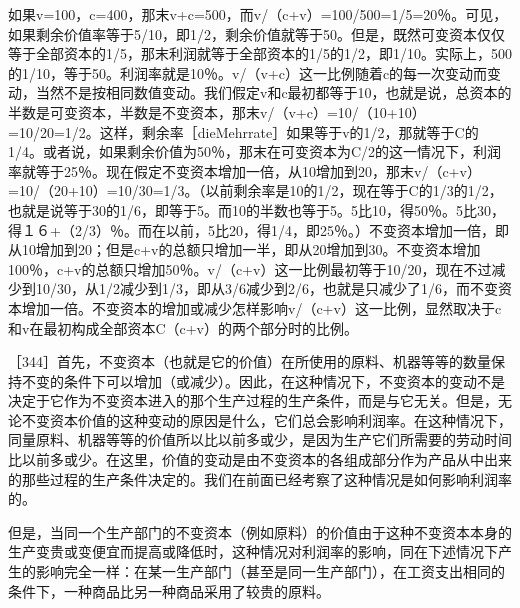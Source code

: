 如果v=100，c=400，那末v+c=500，而v/（c+v）=100/500=1/5=20％。可见，如果剩余价值率等于5/10，即1/2，剩余价值就等于50。但是，既然可变资本仅仅等于全部资本的1/5，那末利润就等于全部资本的1/5的1/2，即1/10。实际上，500的1/10，等于50。利润率就是10％。v/（v+c）这一比例随着c的每一次变动而变动，当然不是按相同数值变动。我们假定v和c最初都等于10，也就是说，总资本的半数是可变资本，半数是不变资本，那末v/（v+c）=10/（10+10）=10/20=1/2。这样，剩余率［dieMehrrate］如果等于v的1/2，那就等于C的1/4。或者说，如果剩余价值为50％，那末在可变资本为C/2的这一情况下，利润率就等于25％。现在假定不变资本增加一倍，从10增加到20，那末v/（c+v）=10/（20+10）=10/30=1/3。（以前剩余率是10的1/2，现在等于C的1/3的1/2，也就是说等于30的1/6，即等于5。而10的半数也等于5。5比10，得50％。5比30，得１６+（2/3）％。而在以前，5比20，得1/4，即25％。）不变资本增加一倍，即从10增加到20；但是c+v的总额只增加一半，即从20增加到30。不变资本增加100％，c+v的总额只增加50％。v/（c+v）这一比例最初等于10/20，现在不过减少到10/30，从1/2减少到1/3，即从3/6减少到2/6，也就是只减少了1/6，而不变资本增加一倍。不变资本的增加或减少怎样影响v/（c+v）这一比例，显然取决于c和v在最初构成全部资本C（c+v）的两个部分时的比例。

［344］首先，不变资本（也就是它的价值）在所使用的原料、机器等等的数量保持不变的条件下可以增加（或减少）。因此，在这种情况下，不变资本的变动不是决定于它作为不变资本进入的那个生产过程的生产条件，而是与它无关。但是，无论不变资本价值的这种变动的原因是什么，它们总会影响利润率。在这种情况下，同量原料、机器等等的价值所以比以前多或少，是因为生产它们所需要的劳动时间比以前多或少。在这里，价值的变动是由不变资本的各组成部分作为产品从中出来的那些过程的生产条件决定的。我们在前面已经考察了这种情况是如何影响利润率的。

但是，当同一个生产部门的不变资本（例如原料）的价值由于这种不变资本本身的生产变贵或变便宜而提高或降低时，这种情况对利润率的影响，同在下述情况下产生的影响完全一样：在某一生产部门（甚至是同一生产部门），在工资支出相同的条件下，一种商品比另一种商品采用了较贵的原料。

